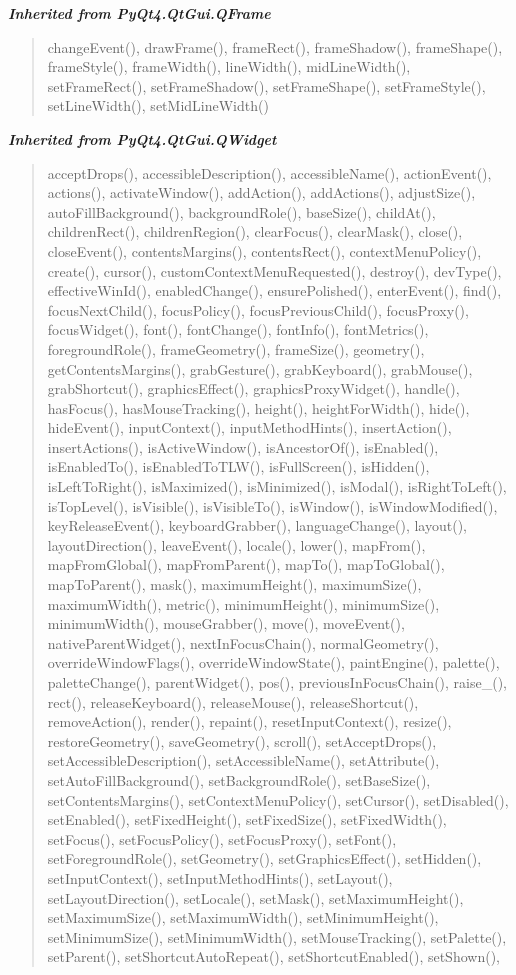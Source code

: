 \large{\textbf{\textit{Inherited from PyQt4.QtGui.QFrame}}}

\begin{quote}
changeEvent(), drawFrame(), frameRect(), frameShadow(), frameShape(), frameStyle(), frameWidth(), lineWidth(), midLineWidth(), setFrameRect(), setFrameShadow(), setFrameShape(), setFrameStyle(), setLineWidth(), setMidLineWidth()
\end{quote}

\large{\textbf{\textit{Inherited from PyQt4.QtGui.QWidget}}}

\begin{quote}
acceptDrops(), accessibleDescription(), accessibleName(), actionEvent(), actions(), activateWindow(), addAction(), addActions(), adjustSize(), autoFillBackground(), backgroundRole(), baseSize(), childAt(), childrenRect(), childrenRegion(), clearFocus(), clearMask(), close(), closeEvent(), contentsMargins(), contentsRect(), contextMenuPolicy(), create(), cursor(), customContextMenuRequested(), destroy(), devType(), effectiveWinId(), enabledChange(), ensurePolished(), enterEvent(), find(), focusNextChild(), focusPolicy(), focusPreviousChild(), focusProxy(), focusWidget(), font(), fontChange(), fontInfo(), fontMetrics(), foregroundRole(), frameGeometry(), frameSize(), geometry(), getContentsMargins(), grabGesture(), grabKeyboard(), grabMouse(), grabShortcut(), graphicsEffect(), graphicsProxyWidget(), handle(), hasFocus(), hasMouseTracking(), height(), heightForWidth(), hide(), hideEvent(), inputContext(), inputMethodHints(), insertAction(), insertActions(), isActiveWindow(), isAncestorOf(), isEnabled(), isEnabledTo(), isEnabledToTLW(), isFullScreen(), isHidden(), isLeftToRight(), isMaximized(), isMinimized(), isModal(), isRightToLeft(), isTopLevel(), isVisible(), isVisibleTo(), isWindow(), isWindowModified(), keyReleaseEvent(), keyboardGrabber(), languageChange(), layout(), layoutDirection(), leaveEvent(), locale(), lower(), mapFrom(), mapFromGlobal(), mapFromParent(), mapTo(), mapToGlobal(), mapToParent(), mask(), maximumHeight(), maximumSize(), maximumWidth(), metric(), minimumHeight(), minimumSize(), minimumWidth(), mouseGrabber(), move(), moveEvent(), nativeParentWidget(), nextInFocusChain(), normalGeometry(), overrideWindowFlags(), overrideWindowState(), paintEngine(), palette(), paletteChange(), parentWidget(), pos(), previousInFocusChain(), raise\_(), rect(), releaseKeyboard(), releaseMouse(), releaseShortcut(), removeAction(), render(), repaint(), resetInputContext(), resize(), restoreGeometry(), saveGeometry(), scroll(), setAcceptDrops(), setAccessibleDescription(), setAccessibleName(), setAttribute(), setAutoFillBackground(), setBackgroundRole(), setBaseSize(), setContentsMargins(), setContextMenuPolicy(), setCursor(), setDisabled(), setEnabled(), setFixedHeight(), setFixedSize(), setFixedWidth(), setFocus(), setFocusPolicy(), setFocusProxy(), setFont(), setForegroundRole(), setGeometry(), setGraphicsEffect(), setHidden(), setInputContext(), setInputMethodHints(), setLayout(), setLayoutDirection(), setLocale(), setMask(), setMaximumHeight(), setMaximumSize(), setMaximumWidth(), setMinimumHeight(), setMinimumSize(), setMinimumWidth(), setMouseTracking(), setPalette(), setParent(), setShortcutAutoRepeat(), setShortcutEnabled(), setShown(), 
\end{quote}
